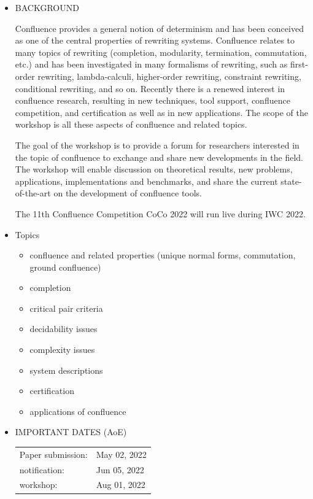 \documentclass[prodmode,acmtecs]{acmsmall} %
\begin{document}
\begin{itemize}\item  BACKGROUND 
 
  Confluence provides a general notion of determinism and has been conceived as one of the central properties of rewriting systems. Confluence relates to many topics of rewriting (completion, modularity, termination, commutation, etc.) and has been investigated in many formalisms of rewriting, such as first-order rewriting, lambda-calculi, higher-order rewriting, constraint rewriting, conditional rewriting, and so on. Recently there is a renewed interest in confluence research, resulting in new techniques, tool support, confluence competition, and certification as well as in new applications. The scope of the workshop is all these aspects of confluence and related topics. 
 
  The goal of the workshop is to provide a forum for researchers interested in the topic of confluence to exchange and share new developments in the field. The workshop will enable discussion on theoretical results, new problems, applications, implementations and benchmarks, and share the current state-of-the-art on the development of confluence tools. 
 
  The 11th Confluence Competition CoCo 2022 will run live during IWC 2022. 
 
\item  Topics 
 
\begin{itemize}\item  confluence and related properties (unique normal forms, commutation, ground confluence)
\item  completion
\item  critical pair criteria
\item  decidability issues
\item  complexity issues
\item  system descriptions
\item  certification
\item  applications of confluence 
\end{itemize} 
\item  IMPORTANT DATES (AoE) 
 
\begin{tabulary}{\linewidth}{LL}Paper submission:  & May 02, 2022 \\
notification:  & Jun 05, 2022 \\
workshop:  & Aug 01, 2022 \\
\end{tabulary}
 

\end{itemize}
\end{document}

